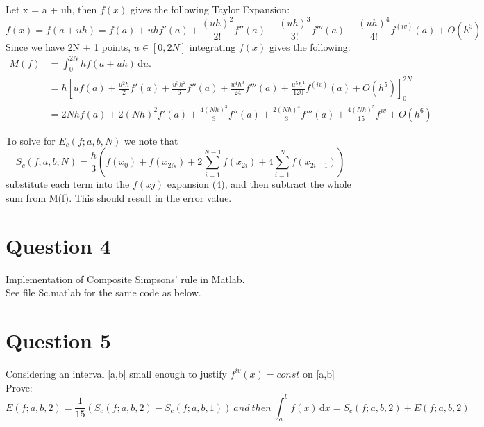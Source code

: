 \documentclass[fleqn]{report}
\begin{document}
\noindent Let x = a + uh, then $f(x)$ gives the following Taylor Expansion:
\begin{equation}
f(x) = f(a + uh) = f(a) + uhf'(a) + \frac{(uh)^2}{2!}f''(a) + \frac{(uh)^3}{3!}f'''(a) + \frac{(uh)^4}{4!}f^{(iv)}(a) + O(h^5)
\end{equation}
Since we have 2N + 1 points, $u \in [0, 2N]$ integrating $f(x)$ gives the following:
\begin{equation}
\begin{split}
M(f) &= \int_0^{2N} \! hf(a + uh) \, \mathrm{d}u.\\ 
&= h [uf(a) + \frac{u^2h}{2}f'(a) + \frac{u^3h^2}{6}f''(a) + \frac{u^4h^3}{24}f'''(a) + \frac{u^5h^4}{120}f^{(iv)}(a) + O(h^5)]_0^{2N}\\
&= 2Nhf(a) + 2(Nh)^2f'(a) + \frac{4(Nh)^3}{3}f''(a) + \frac{2(Nh)^4}{3}f'''(a) + \frac{4(Nh)^5}{15}f^{iv}+ O(h^6)
\end{split}
\end{equation}

\noindent To solve for $E_c(f;a,b,N)$ we note that 
\begin{equation*}
S_c(f;a,b,N) = \frac{h}{3} (f(x_0) + f(x_{2N}) +  2\sum_{i=1}^{N-1} f(x_{2i}) + 4\sum_{i=1}^{N} f(x_{2i-1}))
\end{equation*}
substitute each term into the $f(xj)$ expansion (4), and then subtract the whole sum from
M(f). This should result in the error value.

\pagebreak

\section{Question 4}
Implementation of Composite Simpsons' rule in Matlab. \\

See file Sc.matlab for the same code as below.



\pagebreak

\section{Question 5}
Considering an interval [a,b] small enough to justify $f^{iv}(x) = const$ on [a,b] Prove: 
\begin{equation*}
E(f;a,b,2) = \frac{1}{15}(S_c(f;a,b,2) - S_c(f;a,b,1))\ and\ then\ \int_a^b \! f(x) \, \mathrm{d}x  = S_c(f;a,b,2) + E(f;a,b,2)
\end{equation*}
\end{document}

